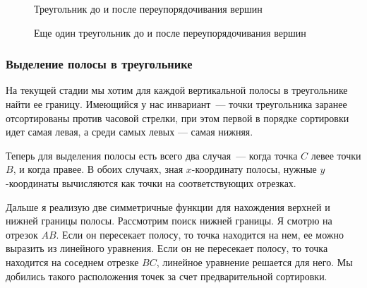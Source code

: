 \documentclass{article}
\begin{document}
\begin{center}
\begin{figure}[H]
\caption{Треугольник до и после переупорядочивания вершин}
\label{ris:image}
\end{figure}
\begin{figure}[H]
\caption{Еще один треугольник до и после переупорядочивания вершин}
\label{ris:image}
\end{figure}
\end{center}

\subsubsection{Выделение полосы в треугольнике}

На текущей стадии мы хотим для каждой вертикальной полосы в треугольнике найти ее границу. Имеющийся у нас инвариант~--- точки треугольника заранее отсортированы против часовой стрелки, при этом первой в порядке сортировки идет самая левая, а среди самых левых --- самая нижняя.

Теперь для выделения полосы есть всего два случая~--- когда точка $C$ левее точки $B$, и когда правее. В обоих случаях, зная $x$-координату полосы, нужные $y$-координаты вычисляются как точки на соответствующих отрезках. 

Дальше я реализую две симметричные функции для нахождения верхней и нижней границы полосы. Рассмотрим поиск нижней границы. Я смотрю на отрезок $AB$. Если он пересекает полосу, то точка находится на нем, ее можно выразить из линейного уравнения. Если он не пересекает полосу, то точка находится на соседнем отрезке $BC$, линейное уравнение решается для него. Мы добились такого расположения точек за счет предварительной сортировки.
\end{document}
